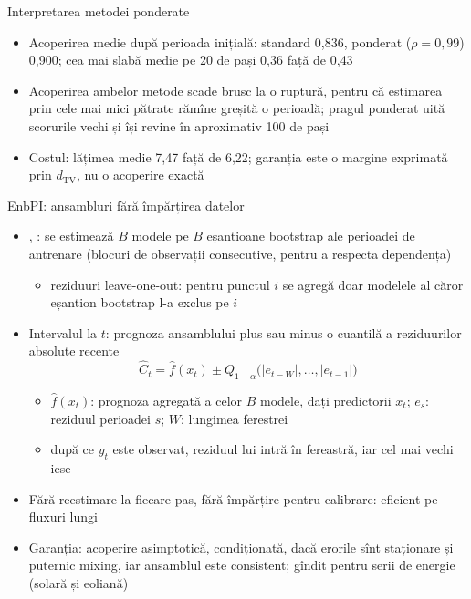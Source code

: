 \begin{frame}{Interpretarea metodei ponderate}
\itemsize{\small}
\begin{itemize}
    \item Acoperirea medie după perioada inițială: standard 0{,}836, ponderat ($\rho = 0{,}99$) 0{,}900; cea mai slabă medie pe 20 de pași 0{,}36 față de 0{,}43
    \item Acoperirea ambelor metode scade brusc la o ruptură, pentru că estimarea prin cele mai mici pătrate rămîne greșită o perioadă; pragul ponderat uită scorurile vechi și își revine în aproximativ 100 de pași
    \item Costul: lățimea medie 7{,}47 față de 6{,}22; garanția este o margine exprimată prin $d_{\mathrm{TV}}$, nu o acoperire exactă
\end{itemize}
\end{frame}

\begin{frame}{EnbPI: ansambluri fără împărțirea datelor}
\itemsize{\small}
\begin{itemize}
    \item {}, : se estimează $B$ modele pe $B$ eșantioane bootstrap ale perioadei de antrenare (blocuri de observații consecutive, pentru a respecta dependența)
    \begin{itemize}
        \item reziduuri leave-one-out: pentru punctul $i$ se agregă doar modelele al căror eșantion bootstrap l-a exclus pe $i$
    \end{itemize}
    \item Intervalul la $t$: prognoza ansamblului plus sau minus o cuantilă a reziduurilor absolute recente \[ \hat C_t = \hat f(x_t) \pm Q_{1-\alpha}\big(|e_{t-W}|, \dots, |e_{t-1}|\big) \]
    \begin{itemize}
        \item $\hat f(x_t)$: prognoza agregată a celor $B$ modele, dați predictorii $x_t$; $e_s$: reziduul perioadei $s$; $W$: lungimea ferestrei
        \item după ce $y_t$ este observat, reziduul lui intră în fereastră, iar cel mai vechi iese
    \end{itemize}
    \item Fără reestimare la fiecare pas, fără împărțire pentru calibrare: eficient pe fluxuri lungi
    \item Garanția: acoperire asimptotică, condiționată, dacă erorile sînt staționare și puternic mixing, iar ansamblul este consistent; gîndit pentru serii de energie (solară și eoliană)
\end{itemize}
\end{frame}

